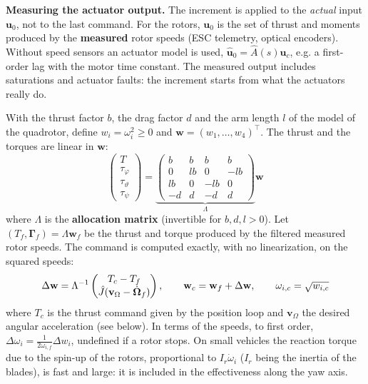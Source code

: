 \documentclass[10pt, a4paper]{report}
\begin{document}
\noindent\textbf{Measuring the actuator output.} The increment is applied to the \textit{actual} input $\mathbf u_0$, not to the last command. For the rotors, $\mathbf u_0$ is the set of thrust and moments produced by the \textbf{measured} rotor speeds (ESC telemetry, optical encoders). Without speed sensors an actuator model is used, $\hat{\mathbf u}_0=\hat A(s)\mathbf u_c$, e.g. a first-order lag with the motor time constant. The measured output includes saturations and actuator faults: the increment starts from what the actuators really do.

With the thrust factor $b$, the drag factor $d$ and the arm length $l$ of the model of the quadrotor, define $w_i=\omega_i^2\ge0$ and $\mathbf w=(w_1,\dots,w_4)^\top$. The thrust and the torques are linear in $\mathbf w$:\begin{equation}\label{indi_allocation}
    \begin{pmatrix}T\\\tau_\varphi\\\tau_\vartheta\\\tau_\psi\end{pmatrix}=\underbrace{\begin{pmatrix}
        b&b&b&b\\
        0&lb&0&-lb\\
        lb&0&-lb&0\\
        -d&d&-d&d
    \end{pmatrix}}_{\Lambda}\mathbf w
\end{equation}
where $\Lambda$ is the \textbf{allocation matrix} (invertible for $b,d,l>0$). Let $(T_f,\boldsymbol{\Gamma}_f)=\Lambda\mathbf w_f$ be the thrust and torque produced by the filtered measured rotor speeds. The command is computed exactly, with no linearization, on the squared speeds:\begin{equation}\label{indi_allocation_cmd}
    \Delta\mathbf w=\Lambda^{-1}\begin{pmatrix}T_c-T_f\\\hat J(\mathbf v_\Omega-\dot{{\boldsymbol{\Omega}}}_f)\end{pmatrix},\qquad\mathbf w_c=\mathbf w_f+\Delta\mathbf w,\qquad\omega_{i,c}=\sqrt{w_{i,c}}
\end{equation}
where $T_c$ is the thrust command given by the position loop and $\mathbf v_\Omega$ the desired angular acceleration (see below). In terms of the speeds, to first order, $\Delta\omega_i=\frac{1}{2\omega_{i,f}}\Delta w_i$, undefined if a rotor stops. On small vehicles the reaction torque due to the spin-up of the rotors, proportional to $I_r\dot\omega_i$ ($I_r$ being the inertia of the blades), is fast and large: it is included in the effectiveness along the yaw axis.\bigskip
\end{document}
